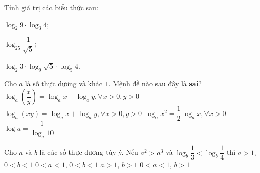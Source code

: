 \begin{bt}%
	Tính giá trị các biểu thức sau:
	\begin{listEX}[3]
		\item[a)] $ \log_{2} 9 \cdot \log_3 4$;
		\item[b)] $ \log_{25} \dfrac{1}{\sqrt{5}}$;
		\item[c)] $ \log_2 3 \cdot \log_9 \sqrt{5}\cdot \log_5 4$. 
	\end{listEX}
\end{bt}

\begin{ex}%
	Cho $a$ là  số thực dương và khác $1$. Mệnh đề nào sau đây là \textbf{sai}?
	 \choice
		{$\log_a\left(\dfrac{x}{y}\right)=\log_a x-\log_a y,\forall  x>0,y>0$}
		{$\log_a(xy)=\log_a  x+\log_a y,\forall x>0,y>0$}
		 {\True $\log_a x^2=\dfrac{1}{2}\log_a x,\forall x>0$}
		{$\log a=\dfrac{1}{\log_a 10}$} 
\end{ex}

\begin{ex}%
	Cho $a$ và $b$ là các số thực dương tùy ý. Nếu $a^2>a^3$ và  $\log_b\dfrac{1}{3}<\log_b\dfrac{1}{4}$ thì
	 \choice
		{\True  $a>1$, $0<b<1$}
		{$0<a<1$,  $0<b<1$}
		{$a>1$, $b>1$} 
		 {$0<a<1$, $b>1$}
\end{ex}

